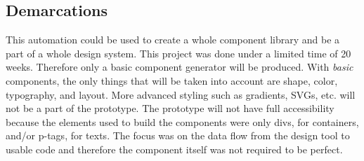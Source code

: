 \subsection{Demarcations}%
\label{sub:Demarcations}
This automation could be used to create a whole component library and be a part of a whole design system. This project was done under a limited time of 20 weeks. Therefore only a basic component generator will be produced. With \textit{basic} components, the only things that will be taken into account are shape, color, typography, and layout. More advanced styling such as gradients, SVGs, etc. will not be a part of the prototype. The prototype will not have full accessibility because  the elements used to build the components were only divs, for containers, and/or p-tags, for texts.
The focus was on the data flow from the design tool to usable code and therefore the component itself was not required to be perfect. 

